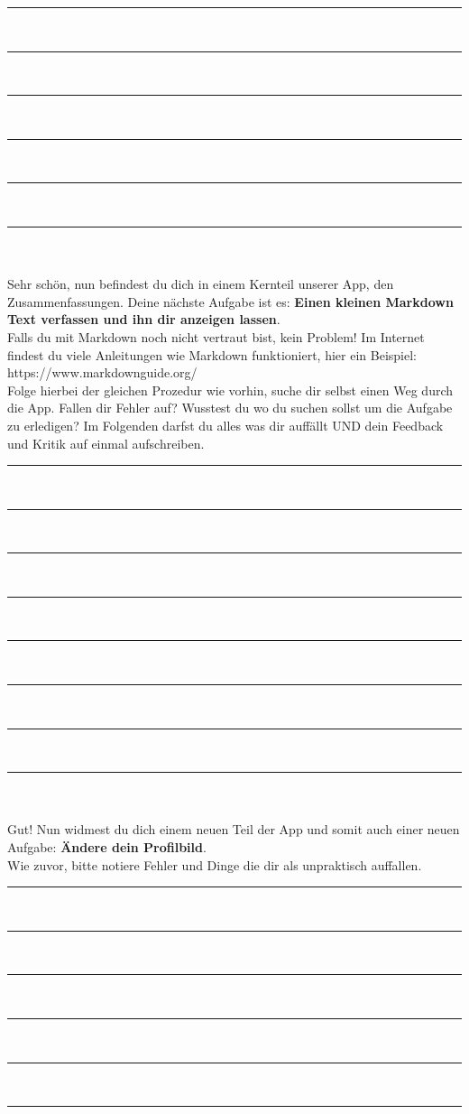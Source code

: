 \noindent\rule{\textwidth}{0.4pt}\\
\noindent\rule{\textwidth}{0.4pt}\\
\noindent\rule{\textwidth}{0.4pt}\\
\noindent\rule{\textwidth}{0.4pt}\\
\noindent\rule{\textwidth}{0.4pt}\\
\noindent\rule{\textwidth}{0.4pt}\\\\
Sehr schön, nun befindest du dich in einem Kernteil unserer App, den Zusammenfassungen. Deine nächste Aufgabe ist es: \textbf{Einen kleinen Markdown Text verfassen und ihn dir anzeigen lassen}.\\
Falls du mit Markdown noch nicht vertraut bist, kein Problem! Im Internet findest du viele Anleitungen wie Markdown funktioniert, hier ein Beispiel: https://www.markdownguide.org/ \\
Folge hierbei der gleichen Prozedur wie vorhin, suche dir selbst einen Weg durch die App. Fallen dir Fehler auf? Wusstest du wo du suchen sollst um die Aufgabe zu erledigen? Im Folgenden darfst du alles was dir auffällt UND dein Feedback und Kritik auf einmal aufschreiben.\\
\noindent\rule{\textwidth}{0.4pt}\\
\noindent\rule{\textwidth}{0.4pt}\\
\noindent\rule{\textwidth}{0.4pt}\\
\noindent\rule{\textwidth}{0.4pt}\\
\noindent\rule{\textwidth}{0.4pt}\\
\noindent\rule{\textwidth}{0.4pt}\\
\noindent\rule{\textwidth}{0.4pt}\\
\noindent\rule{\textwidth}{0.4pt}\\\\
Gut! Nun widmest du dich einem neuen Teil der App und somit auch einer neuen Aufgabe: \textbf{Ändere dein Profilbild}. \\
Wie zuvor, bitte notiere Fehler und Dinge die dir als unpraktisch auffallen.\\
\noindent\rule{\textwidth}{0.4pt}\\
\noindent\rule{\textwidth}{0.4pt}\\
\noindent\rule{\textwidth}{0.4pt}\\
\noindent\rule{\textwidth}{0.4pt}\\
\noindent\rule{\textwidth}{0.4pt}\\
\noindent\rule{\textwidth}{0.4pt}\\

